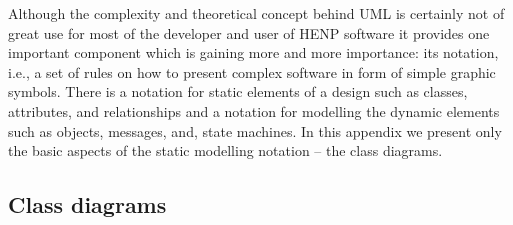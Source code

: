 \documentclass[twoside]{article}
\begin{document}
Although the complexity and theoretical concept behind UML is
certainly not of great use for most of the developer and user of HENP
software it provides one important component which is gaining more and
more importance: its notation, i.e., a set of rules on how to present
complex software in form of simple graphic symbols.  There is a
notation for static elements of a design such as classes, attributes,
and relationships and a notation for modelling the dynamic elements
such as objects, messages, and, state machines. In this appendix we
present only the basic aspects of the static modelling notation -- the
class diagrams.   

\subsection{Class diagrams}
\end{document}
